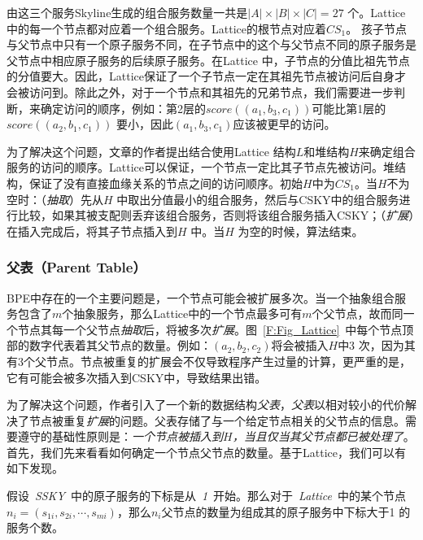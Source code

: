 由这三个服务Skyline生成的组合服务数量一共是$|A|\times|B|\times|C|=27$ 个。Lattice中的每一个节点都对应着一个组合服务。Lattice的根节点对应着$CS_{1}$。 孩子节点与父节点中只有一个原子服务不同，在子节点中的这个与父节点不同的原子服务是父节点中相应原子服务的后续原子服务。在Lattice 中，子节点的分值比祖先节点的分值要大。因此，Lattice保证了一个子节点一定在其祖先节点被访问后自身才会被访问到。除此之外，对于一个节点和其祖先的兄弟节点，我们需要进一步判断，来确定访问的顺序，例如：第2层的$score((a_{1},b_{3},c_{1}))$可能比第1层的$score((a_{2},b_{1},c_{1}))$ 要小，因此$(a_{1},b_{3},c_{1})$应该被更早的访问。

为了解决这个问题，文章的作者提出结合使用Lattice 结构$L$和堆结构$H$来确定组合服务的访问的顺序。Lattice可以保证，一个节点一定比其子节点先被访问。堆结构，保证了没有直接血缘关系的节点之间的访问顺序。初始$H$中为$CS_{1}$。当$H$不为空时：（\emph{抽取}）先从$H$ 中取出分值最小的组合服务，然后与CSKY中的组合服务进行比较，如果其被支配则丢弃该组合服务，否则将该组合服务插入CSKY；（\emph{扩展}）在插入完成后，将其子节点插入到$H$ 中。当$H$ 为空的时候，算法结束。

\subsubsection{父表（Parent Table）}

BPE中存在的一个主要问题是，一个节点可能会被扩展多次。当一个抽象组合服务包含了$m$个抽象服务，那么Lattice中的一个节点最多可有$m$个父节点，故而同一个节点其每一个父节点\emph{抽取}后，将被多次\emph{扩展}。图~\ref{F:Fig_Lattice}~中每个节点顶部的数字代表着其父节点的数量。例如：$(a_{2},b_{2},c_{2})$将会被插入$H$中3 次，因为其有3个父节点。节点被重复的扩展会不仅导致程序产生过量的计算，更严重的是，它有可能会被多次插入到CSKY中，导致结果出错。

为了解决这个问题，作者引入了一个新的数据结构\emph{父表}，\emph{父表}以相对较小的代价解决了节点被重复\emph{扩展}的问题。父表存储了与一个给定节点相关的父节点的信息。需要遵守的基础性原则是：\emph{一个节点被插入到$H$，当且仅当其父节点都已被处理了}。首先，我们先来看看如何确定一个节点父节点的数量。基于Lattice，我们可以有如下发现。

\begin{property}[]\label{P:Prop_QYuParentCount}
假设~\emph{SSKY}~中的原子服务的下标是从~\emph{1}~开始。那么对于~\emph{Lattice}~中的某个节点$n_{i}=(s_{1i},s_{2i},\cdots,s_{mi})$，那么$n_{i}$父节点的数量为组成其的原子服务中下标大于1 的服务个数。
\end{property}

